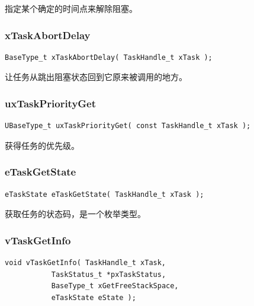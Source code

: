 \documentclass[12pt, a4paper]{article}
\begin{document}
指定某个确定的时间点来解除阻塞。

\subsubsection {xTaskAbortDelay}

\begin{lstlisting}[language={[ANSI]C},keywordstyle=\color{blue!70},commentstyle=\color{red!50!green!50!blue!50},frame=shadowbox, rulesepcolor=\color{red!20!green!20!blue!20}]
BaseType_t xTaskAbortDelay( TaskHandle_t xTask );
\end{lstlisting}

让任务从跳出阻塞状态回到它原来被调用的地方。

\subsubsection {uxTaskPriorityGet}

\begin{lstlisting}[language={[ANSI]C},keywordstyle=\color{blue!70},commentstyle=\color{red!50!green!50!blue!50},frame=shadowbox, rulesepcolor=\color{red!20!green!20!blue!20}]
UBaseType_t uxTaskPriorityGet( const TaskHandle_t xTask );
\end{lstlisting}

获得任务的优先级。

\subsubsection {eTaskGetState}

\begin{lstlisting}[language={[ANSI]C},keywordstyle=\color{blue!70},commentstyle=\color{red!50!green!50!blue!50},frame=shadowbox, rulesepcolor=\color{red!20!green!20!blue!20}]
eTaskState eTaskGetState( TaskHandle_t xTask );
\end{lstlisting}

获取任务的状态码，是一个枚举类型。

\subsubsection {vTaskGetInfo}

\begin{lstlisting}[language={[ANSI]C},keywordstyle=\color{blue!70},commentstyle=\color{red!50!green!50!blue!50},frame=shadowbox, rulesepcolor=\color{red!20!green!20!blue!20}]
void vTaskGetInfo( TaskHandle_t xTask, 
		   TaskStatus_t *pxTaskStatus,
		   BaseType_t xGetFreeStackSpace,
		   eTaskState eState );
\end{lstlisting}
\end{document}
